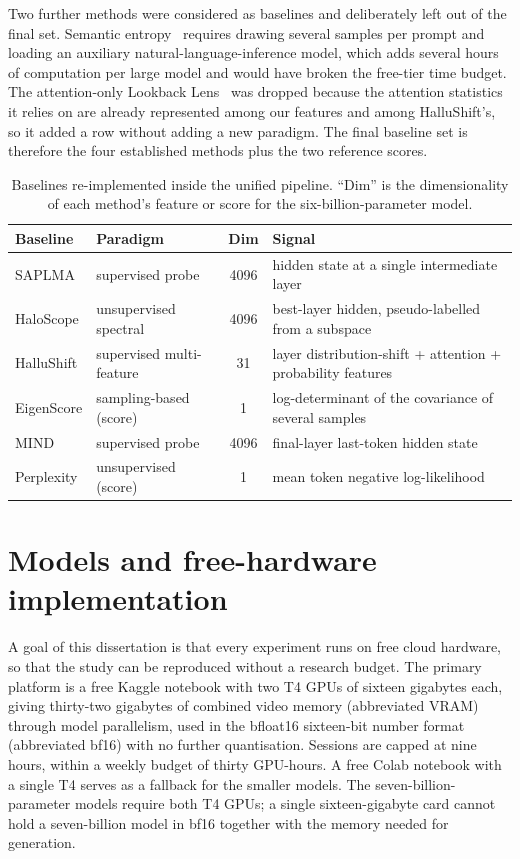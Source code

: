 Two further methods were considered as baselines and deliberately left out of the final
set. Semantic entropy~\cite{kuhn2023semantic} requires drawing several samples per prompt
and loading an auxiliary natural-language-inference model, which adds several hours of
computation per large model and would have broken the free-tier time budget. The
attention-only Lookback Lens~\cite{chuang2024lookback} was dropped because the attention
statistics it relies on are already represented among our features and among HalluShift's,
so it added a row without adding a new paradigm. The final baseline set is therefore the
four established methods plus the two reference scores.

\begin{table}[t]
\centering
\caption{Baselines re-implemented inside the unified pipeline. ``Dim'' is the
dimensionality of each method's feature or score for the six-billion-parameter model.}
\label{tab:baselines}
\small
\renewcommand{\arraystretch}{1.2}
\begin{tabularx}{\textwidth}{l l c X}
\toprule
\textbf{Baseline} & \textbf{Paradigm} & \textbf{Dim} & \textbf{Signal} \\
\midrule
SAPLMA      & supervised probe          & 4096 & hidden state at a single intermediate layer \\
HaloScope   & unsupervised spectral     & 4096 & best-layer hidden, pseudo-labelled from a subspace \\
HalluShift  & supervised multi-feature  & 31   & layer distribution-shift + attention + probability features \\
EigenScore  & sampling-based (score)    & 1    & log-determinant of the covariance of several samples \\
MIND        & supervised probe          & 4096 & final-layer last-token hidden state \\
Perplexity  & unsupervised (score)      & 1    & mean token negative log-likelihood \\
\bottomrule
\end{tabularx}
\end{table}

\section{Models and free-hardware implementation}
\label{sec:models}

A goal of this dissertation is that every experiment runs on free cloud hardware, so that
the study can be reproduced without a research budget. The primary platform is a free
Kaggle notebook with two T4 GPUs of sixteen gigabytes each, giving thirty-two gigabytes of
combined video memory (abbreviated VRAM) through model parallelism, used in the bfloat16
sixteen-bit number format (abbreviated bf16) with no further quantisation. Sessions are
capped at nine hours, within a weekly budget of thirty GPU-hours. A free Colab notebook
with a single T4 serves as a fallback for the smaller models. The seven-billion-parameter
models require both T4 GPUs; a single sixteen-gigabyte card cannot hold a seven-billion
model in bf16 together with the memory needed for generation.

